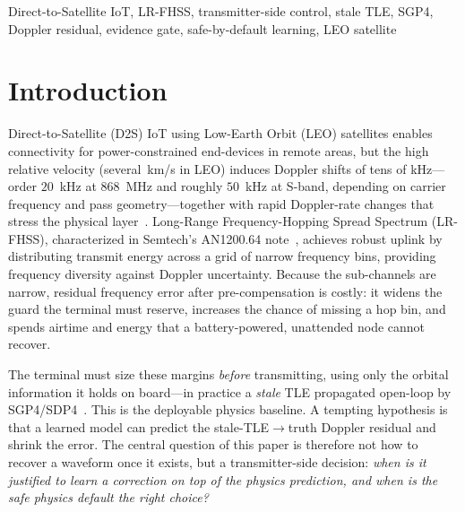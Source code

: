 \documentclass[conference]{IEEEtran}
\begin{document}
\begin{IEEEkeywords}
Direct-to-Satellite IoT, LR-FHSS, transmitter-side control, stale TLE, SGP4,
Doppler residual, evidence gate, safe-by-default learning, LEO satellite
\end{IEEEkeywords}

\section{Introduction}
\label{sec:intro}

Direct-to-Satellite (D2S) IoT using Low-Earth Orbit (LEO) satellites enables
connectivity for power-constrained end-devices in remote areas, but the high
relative velocity (several~km/s in LEO) induces Doppler shifts of tens of
kHz---order $20$~kHz at 868~MHz and roughly $50$~kHz at S-band, depending on
carrier frequency and pass geometry---together with rapid Doppler-rate changes
that stress the physical layer~\cite{hurn2023lrfhss}. Long-Range
Frequency-Hopping Spread Spectrum (LR-FHSS), characterized in Semtech's
AN1200.64 note~\cite{semtech2023lrfhss}, achieves robust uplink by distributing
transmit energy across a grid of narrow frequency bins, providing frequency
diversity against Doppler uncertainty. Because the sub-channels are narrow,
residual frequency error after pre-compensation is costly: it widens the guard
the terminal must reserve, increases the chance of missing a hop bin, and spends
airtime and energy that a battery-powered, unattended node cannot recover.

The terminal must size these margins \emph{before} transmitting, using only the
orbital information it holds on board---in practice a \emph{stale} TLE propagated
open-loop by SGP4/SDP4~\cite{vallado2007fundamentals}. This is the deployable
physics baseline. A tempting hypothesis is that a learned model can predict the
stale-TLE$\rightarrow$truth Doppler residual and shrink the error. The central
question of this paper is therefore not how to recover a waveform once it
exists, but a transmitter-side decision: \emph{when is it justified to learn a
correction on top of the physics prediction, and when is the safe physics
default the right choice?}
\end{document}
